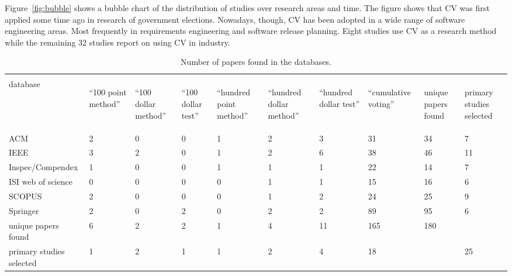 Figure~\ref{fig:bubble} shows a bubble chart of the distribution of studies over research areas and time.
The figure shows that CV was first applied some time ago in research of government elections.
Nowadays, though, CV has been adopted in a wide range of software engineering areas.
Most frequently in requirements engineering and software release planning.
Eight studies use CV as a research method while the remaining 32 studies report on using CV in industry.
%
\begin{center}
\begin{table}

	\scriptsize
\caption{\label{tab:Number-of-papers}Number of papers found in the databases.}

\begin{tabular}{|>{\raggedright}b{}|>{\raggedright}p{}|>{\raggedright}p{}|>{\raggedright}p{}|>{\raggedright}p{}|>{\raggedright}p{}|>{\raggedright}p{}|>{\raggedright}p{}|>{\raggedright}p{}|>{\raggedright}p{}|}
\hline 
 & \multicolumn{7}{l|}{search strings} &  & \tabularnewline
\cline{2-8} 
database & \begin{sideways}
{}``100 point method''%
\end{sideways} & \begin{sideways}
{}``100 dollar method''%
\end{sideways} & \begin{sideways}
{}``100 dollar test''%
\end{sideways} & \begin{sideways}
{}``hundred point method''%
\end{sideways} & \begin{sideways}
{}``hundred dollar method''%
\end{sideways} & \begin{sideways}
{}``hundred dollar test''%
\end{sideways} & \begin{sideways}
{}``cumulative voting''%
\end{sideways} & \begin{sideways}
unique papers found%
\end{sideways} & \begin{sideways}
primary studies selected%
\end{sideways}\tabularnewline
\hline
ACM & 2 & 0 & 0 & 1 & 2 & 3 & 31 & 34 & 7\tabularnewline
\hline 
IEEE & 3 & 2 & 0 & 1 & 2 & 6 & 38 & 46 & 11\tabularnewline
\hline 
Inspec\slash Compendex & 1 & 0 & 0 & 1 & 1 & 1 & 22 & 14 & 7\tabularnewline
\hline 
ISI web of science & 0 & 0 & 0 & 0 & 1 & 1 & 15 & 16 & 6\tabularnewline
\hline 
SCOPUS & 2 & 0 & 0 & 0 & 1 & 2 & 24 & 25 & 9\tabularnewline
\hline 
Springer & 2 & 0 & 2 & 0 & 2 & 2 & 89 & 95 & 6\tabularnewline
\hline 
unique papers found & 6 & 2 & 2 & 1 & 4 & 11 & 165 & 180 & \tabularnewline
\hline 
primary studies selected & 1 & 2 & 1 & 1 & 2 & 4 & 18 &  & 25\tabularnewline
\hline
\end{tabular}%
\end{table}
\end{center}
